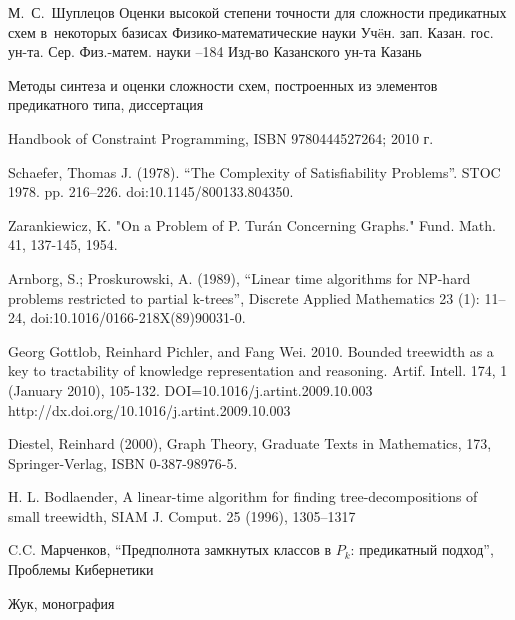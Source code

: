 \documentclass[12pt]{article}
\begin{document}
\clearpage
{}
    \by М.~С.~Шуплецов
    \paper Оценки высокой степени точности для сложности предикатных схем в~некоторых базисах
    \inbook Физико-математические науки
    \serial Уч\"eн. зап. Казан. гос. ун-та. Сер. Физ.-матем. науки
    --184
    \publ Изд-во Казанского ун-та
    \publaddr Казань

Методы синтеза и оценки сложности схем, построенных из элементов предикатного типа, диссертация

 Handbook of Constraint Programming, ISBN 9780444527264; 2010 г.

 Schaefer, Thomas J. (1978). 
``The Complexity of Satisfiability Problems''. STOC 1978. pp. 216–226. doi:10.1145/800133.804350.

 Zarankiewicz, K. "On a Problem of P. Turán Concerning Graphs." Fund. Math. 41, 137-145, 1954. 

 Arnborg, S.; Proskurowski, A. (1989), 
``Linear time algorithms for NP-hard problems restricted to partial k-trees'',
Discrete Applied Mathematics 23 (1): 11–24, doi:10.1016/0166-218X(89)90031-0.

Georg Gottlob, Reinhard Pichler, and Fang Wei. 2010. Bounded treewidth as a key to tractability of knowledge representation and reasoning. Artif. Intell. 174, 1 (January 2010), 105-132. DOI=10.1016/j.artint.2009.10.003 http://dx.doi.org/10.1016/j.artint.2009.10.003

Diestel, Reinhard (2000), Graph Theory, Graduate Texts in Mathematics, 
173, Springer-Verlag, ISBN 0-387-98976-5.

H. L. Bodlaender, A linear-time algorithm for finding 
tree-decompositions of small
treewidth, SIAM J. Comput. 25 (1996), 1305–1317

C.C. Марченков, ``Предполнота замкнутых классов в $P_k$: предикатный подход'', Проблемы Кибернетики

Жук, монография

\endthebibliography
\end{document}

